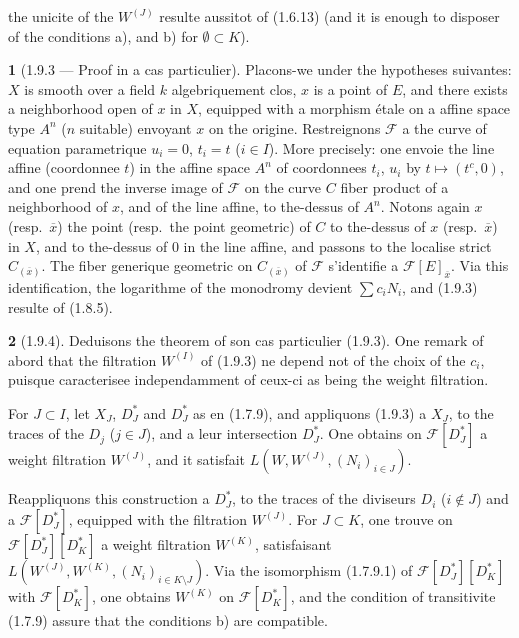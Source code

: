 \documentclass[12pt,a4paper]{article}
\theoremstyle{plain}
\theoremstyle{definition}
\theoremstyle{definition}
\newtheorem{para}{}[section]
\theoremstyle{remark}
\begin{document}
the unicite of the $W^{(J)}$ resulte aussitot of (1.6.13) (and it is enough to disposer of the conditions a), and b) for $\emptyset \subset K$).

\begin{para}[1.9.3 --- Proof in a cas particulier]
Placons-we under the hypotheses suivantes: $X$ is smooth over a field $k$ algebriquement clos, $x$ is a point of $E$, and there exists a neighborhood open of $x$ in $X$, equipped with a morphism étale on a affine space type $A^n$ ($n$ suitable) envoyant $x$ on the origine. Restreignons $\mathscr{F}$ a the curve of equation parametrique $u_i = 0$, $t_i = t$ ($i \in I$). More precisely: one envoie the line affine (coordonnee $t$) in the affine space $A^n$ of coordonnees $t_i$, $u_i$ by $t \mapsto (t^c, 0)$, and one prend the inverse image of $\mathscr{F}$ on the curve $C$ fiber product of a neighborhood of $x$, and of the line affine, to the-dessus of $A^n$. Notons again $x$ (resp.~$\overline{x}$) the point (resp.~the point geometric) of $C$ to the-dessus of $x$ (resp.~$\overline{x}$) in $X$, and to the-dessus of $0$ in the line affine, and passons to the localise strict $C_{(\overline{x})}$. The fiber generique geometric on $C_{(\overline{x})}$ of $\mathscr{F}$ s'identifie a $\mathscr{F}[E]_{\overline{x}}$. Via this identification, the logarithme of the monodromy devient $\sum c_i N_i$, and (1.9.3) resulte of (1.8.5).
\end{para}

\begin{para}[1.9.4]
Deduisons the theorem of son cas particulier (1.9.3). One remark of abord that the filtration $W^{(I)}$ of (1.9.3) ne depend not of the choix of the $c_i$, puisque caracterisee independamment of ceux-ci as being the weight filtration.

For $J \subset I$, let $X_J$, $D_J^*$ and $D_J^*$ as en (1.7.9), and appliquons (1.9.3) a $X_J$, to the traces of the $D_j$ ($j \in J$), and a leur intersection $D_J^*$. One obtains on $\mathscr{F}[D_J^*]$ a weight filtration $W^{(J)}$, and it satisfait $L(W, W^{(J)}, (N_i)_{i \in J})$.

Reappliquons this construction a $D_J^*$, to the traces of the diviseurs $D_i$ ($i \notin J$) and a $\mathscr{F}[D_J^*]$, equipped with the filtration $W^{(J)}$. For $J \subset K$, one trouve on $\mathscr{F}[D_J^*][D_K^*]$ a weight filtration $W^{(K)}$, satisfaisant $L(W^{(J)}, W^{(K)}, (N_i)_{i \in K \setminus J})$. Via the isomorphism (1.7.9.1) of $\mathscr{F}[D_J^*][D_K^*]$ with $\mathscr{F}[D_K^*]$, one obtains $W^{(K)}$ on $\mathscr{F}[D_K^*]$, and the condition of transitivite (1.7.9) assure that the conditions b) are compatible.
\end{para}
\end{document}
